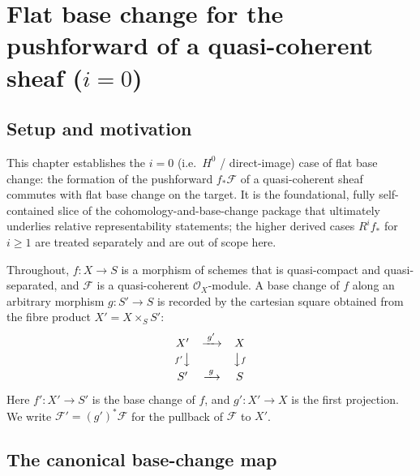 \chapter{Flat base change for the pushforward of a quasi-coherent sheaf ($i=0$)}
\label{chap:Cohomology_FlatBaseChange}

\section{Setup and motivation}

This chapter establishes the $i=0$ (i.e.\ \(H^0\) / direct-image) case of flat
base change: the formation of the pushforward \(f_*\mathcal{F}\) of a
quasi-coherent sheaf commutes with flat base change on the target. It is the
foundational, fully self-contained slice of the cohomology-and-base-change
package that ultimately underlies relative representability statements; the
higher derived cases \(R^i f_*\) for \(i \geq 1\) are treated separately and are
out of scope here.

Throughout, \(f : X \to S\) is a morphism of schemes that is quasi-compact and
quasi-separated, and \(\mathcal{F}\) is a quasi-coherent \(\mathcal{O}_X\)-module.
A base change of \(f\) along an arbitrary morphism \(g : S' \to S\) is recorded
by the cartesian square obtained from the fibre product
\(X' = X \times_S S'\):
\[
  \begin{array}{ccc}
    X' & \xrightarrow{\;g'\;} & X \\[2pt]
    {\scriptstyle f'}\big\downarrow & & \big\downarrow{\scriptstyle f} \\[2pt]
    S' & \xrightarrow{\;g\;} & S
  \end{array}
\]
Here \(f' : X' \to S'\) is the base change of \(f\), and \(g' : X' \to X\) is the
first projection. We write \(\mathcal{F}' = (g')^*\mathcal{F}\) for the pullback
of \(\mathcal{F}\) to \(X'\).

\section{The canonical base-change map}

